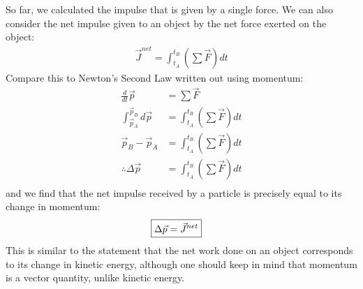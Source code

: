 So far, we calculated the impulse that is given by a single force. We can also consider the net impulse given to an object by the net force exerted on the object:
\begin{align*}
\vec J^{net} = \int_{t_A}^{t_B}\left(\sum\vec F\right) dt
\end{align*}
Compare this to Newton's Second Law written out using momentum:
\begin{align*}
\frac{d}{dt}\vec p &= \sum \vec F\\
\int_{\vec p_A}^{\vec p_B} d\vec p &=  \int_{t_A}^{t_B}\left(\sum\vec F\right) dt\\
\vec p_B - \vec p_A &=  \int_{t_A}^{t_B}\left(\sum\vec F\right) dt\\
\therefore \Delta \vec p &= \int_{t_A}^{t_B}\left(\sum\vec F\right) dt\\
\end{align*}
and we find that the net impulse received by a particle is precisely equal to its change in momentum:
\begin{align}
\Aboxed{\Delta \vec p = \vec J^{net}}
\end{align}
This is similar to the statement that the net work done on an object corresponds to its change in kinetic energy, although one should keep in mind that momentum is a vector quantity, unlike kinetic energy.

